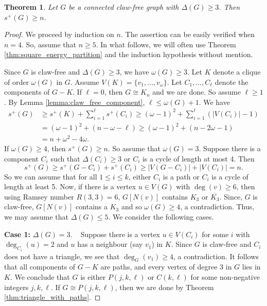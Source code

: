 \documentclass{article}
\newtheorem{theorem}{Theorem}[section]
\begin{document}
\begin{theorem}
Let $G$ be a connected claw-free graph with $\Delta(G)\ge 3$. Then $s^+(G)\ge n$. 
\end{theorem}

\begin{proof} We proceed by induction on $n$. The assertion can be easily verified when $n=4$. So, assume that $n\ge 5$. In what follows, we will often use Theorem \ref{thm:square_energy_partition} and the induction hypothesis without mention.

Since $G$ is claw-free and $\Delta(G)\ge 3$, we have $\omega(G)\ge 3$. Let $K$ denote a clique of order $\omega(G)$ in $G$. Assume $V(K)=\{v_1, \ldots, v_{\omega}\}$. Let $C_1, \ldots, C_{\ell}$ denote the components of $G-K$. If $\ell=0$, then $G\cong K_n$ and we are done. So assume $\ell\ge 1$. By Lemma \ref{lemma:claw_free_component}, $\ell\le \omega(G) + 1$. We have 
\begin{align*}
   s^+(G) & \ge s^+(K) + \sum_{i=1}^{\ell} s^+(C_i) \ge (\omega - 1)^2 + \sum_{i=1}^{\ell} (|V(C_i)| -1)\\
   & = (\omega - 1)^2 + (n-\omega - \ell) \ge (\omega - 1)^2 + (n-2\omega - 1)\\
   & = n + \omega^2 - 4\omega.
\end{align*}
If $\omega(G)\ge 4$, then $s^+(G)\ge n$. So assume that $\omega(G) =3$. Suppose there is a component $C_i$ such that $\Delta(C_i)\ge 3$ or $C_i$ is a cycle of length at most 4. Then
\[ s^+(G)\ge s^+(G-C_i) + s^+(C_i)\ge |V(G-C_i)| + |V(C_i)| = n.\]
So we can assume that for all $1\le i\le k$, either $C_i$ is a path or $C_i$ is a cycle of length at least 5. Now, if there is a vertex $u\in V(G)$ with $\deg(v)\ge 6$, then using Ramsey number $R(3,3)=6$, $G[N(v)]$ contains $K_3$ or $\overline{K_3}$. Since, $G$ is claw-free, $G[N(v)]$ contains a $K_3$ and so $\omega(G)\ge 4$, a contradiction. Thus, we may assume that $\Delta(G)\le 5$. We consider the following cases.

\textbf{Case 1:} $\Delta(G)=3$. ~
Suppose there is a vertex $u\in V(C_i)$ for some $i$ with $\deg_{C_i}(u)=2$ and $u$ has a neighbour (say $v_1$) in $K$. Since $G$ is claw-free and $C_i$ does not have a triangle, we see that $\deg_G(v_1)\ge 4$, a contradiction. It follows that all components of $G-K$ are paths, and every vertex of degree 3 in $G$ lies in $K$. We conclude that $G$ is either $P(j,k,\ell)$ or $C(k,\ell)$ for some non-negative integers $j,k,\ell$. If $G\cong P(j,k,\ell)$, then we are done by Theorem \ref{thm:triangle_with_paths}. 


\end{proof}
\end{document}
